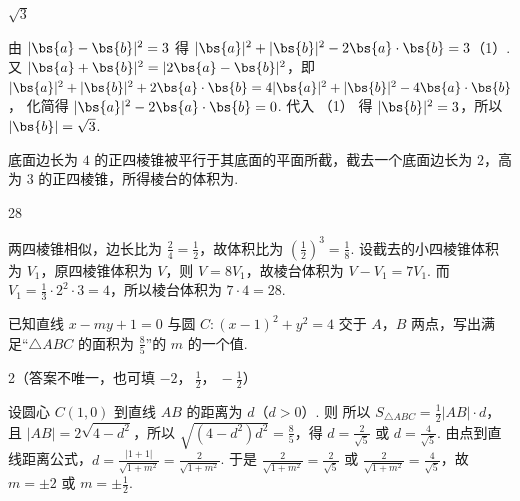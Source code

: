 \begin{answer}
\(\sqrt3\)
\end{answer}

\begin{solution}
由 \(|\bs{a}-\bs{b}|^2=3\) 得 \(|\bs{a}|^2+|\bs{b}|^2-2\bs{a}\cdot\bs{b}=3\)（1）.
又 \( |\bs{a}+\bs{b}|^2=|2\bs{a}-\bs{b}|^2 \)，即 \( |\bs{a}|^2+|\bs{b}|^2+2\bs{a}\cdot\bs{b}=4|\bs{a}|^2+|\bs{b}|^2-4\bs{a}\cdot\bs{b} \)，
化简得 \(|\bs{a}|^2-2\bs{a}\cdot\bs{b}=0\).
代入 （1） 得 \(|\bs{b}|^2=3\)，所以 \(|\bs{b}|=\sqrt3\).
\end{solution}

\begin{problem}
底面边长为 \(4\) 的正四棱锥被平行于其底面的平面所截，截去一个底面边长为 \(2\)，高为 \(3\) 的正四棱锥，所得棱台的体积为\fillinblank{}.
\end{problem}

\begin{answer}
28
\end{answer}

\begin{solution}
两四棱锥相似，边长比为 \(\frac{2}{4}=\frac12\)，故体积比为 \(\left(\frac12\right)^3=\frac18\).
设截去的小四棱锥体积为 \(V_1\)，原四棱锥体积为 \(V\)，则 \(V=8V_1\)，故棱台体积为 \(V-V_1=7V_1\).
而 \(V_1=\frac13\cdot 2^2\cdot 3=4\)，所以棱台体积为 \(7\cdot 4=28\).

\end{solution}

\begin{problem}
已知直线 \(x-my+1=0\) 与圆 \(C:(x-1)^2+y^2=4\) 交于 \(A\)，\(B\) 两点，写出满足“\(\triangle ABC\) 的面积为 \(\frac85\)”的 \(m\) 的一个值\fillinblank{}.
\end{problem}

\begin{answer}
2（答案不唯一，也可填 \(-2\)，\(\ \frac12\)，\(\ -\frac12\)）
\end{answer}

\begin{solution}
设圆心 \(C(1,0)\) 到直线 \(AB\) 的距离为 \(d\)（\(d>0\)）. 则
所以 \(S_{\triangle ABC}=\frac12|AB|\cdot d\)，且 \(|AB|=2\sqrt{4-d^2}\)，所以 \(\sqrt{(4-d^2)d^2}=\frac85\)，得 \(d=\frac{2}{\sqrt5}\) 或 \(d=\frac{4}{\sqrt5}\).
由点到直线距离公式，\(d=\frac{|1+1|}{\sqrt{1+m^2}}=\frac{2}{\sqrt{1+m^2}}\).
于是 \(\frac{2}{\sqrt{1+m^2}}=\frac{2}{\sqrt5}\) 或 \(\frac{2}{\sqrt{1+m^2}}=\frac{4}{\sqrt5}\)，故 \(m=\pm 2\) 或 \(m=\pm\frac12\).

\end{solution}

